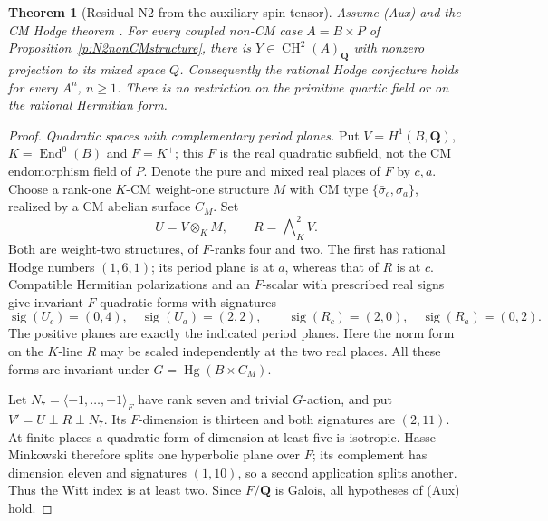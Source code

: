\documentclass[10pt,reqno]{article}
\theoremstyle{emphasizedplain}
\newtheorem{theorem}{Theorem}[section]
\theoremstyle{emphasizeddefinition}
\theoremstyle{emphasizeddefinition}
\DeclareMathOperator{\End}{End}
\DeclareMathOperator{\Hg}{Hg}
\DeclareMathOperator{\CH}{CH}
\newcommand{\Q}{\mathbf Q}
\begin{document}
\begin{theorem}[Residual N2 from the auxiliary-spin tensor]
\label{p:N2auxiliary}
Assume (Aux) and the CM Hodge theorem
\cite[Theorem 1.1]{OpenAICM}. For every coupled non-CM case
$A=B\times P$ of Proposition~\ref{p:N2nonCMstructure}, there is
$Y\in\CH^2(A)_\Q$ with nonzero projection to its mixed space $Q$.
Consequently the rational Hodge conjecture holds for every $A^n$,
$n\geq1$. There is no restriction on the primitive quartic field
or on the rational Hermitian form.
\end{theorem}
\begin{proof}
\emph{Quadratic spaces with complementary period planes.}
Put $V=H^1(B,\Q)$, $K=\End^0(B)$ and $F=K^+$; this $F$ is the
real quadratic subfield, not the CM endomorphism field of $P$.
Denote the pure and mixed real places of $F$ by $c,a$.
Choose a rank-one $K$-CM weight-one structure $M$ with CM type
$\{\bar\sigma_c,\sigma_a\}$, realized by a CM abelian surface $C_M$.
Set
\[
 U=V\otimes_KM,\qquad R=\bigwedge\nolimits_K^2V.
\]
Both are weight-two structures, of $F$-ranks four and two.
The first has rational Hodge numbers $(1,6,1)$; its period plane
is at $a$, whereas that of $R$ is at $c$.
Compatible Hermitian polarizations and an $F$-scalar with prescribed
real signs give invariant $F$-quadratic forms with signatures
\[
 \operatorname{sig}(U_c)=(0,4),\quad
 \operatorname{sig}(U_a)=(2,2),\qquad
 \operatorname{sig}(R_c)=(2,0),\quad
 \operatorname{sig}(R_a)=(0,2).
                                                        \tag{N2.2}
\]
The positive planes are exactly the indicated period planes.
Here the norm form on the $K$-line $R$ may be scaled independently
at the two real places. All these forms are invariant under
$G=\Hg(B\times C_M)$.

Let $N_7=\langle-1,\ldots,-1\rangle_F$ have rank seven and trivial
$G$-action, and put $V'=U\perp R\perp N_7$.
Its $F$-dimension is thirteen and both signatures are $(2,11)$.
At finite places a quadratic form of dimension at least five is
isotropic. Hasse--Minkowski therefore splits one hyperbolic plane
over $F$; its complement has dimension eleven and signatures
$(1,10)$, so a second application splits another.
Thus the Witt index is at least two. Since $F/\Q$ is Galois,
all hypotheses of (Aux) hold.


\end{proof}
\end{document}
